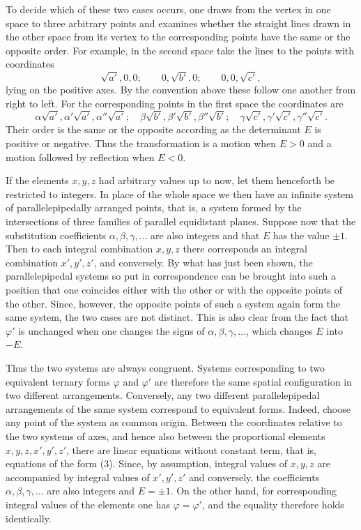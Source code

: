 \documentclass[11pt]{article}
\begin{document}
To decide which of these two cases occurs, one draws from the vertex in one space to three arbitrary points and examines whether the straight lines drawn in the other space from its vertex to the corresponding points have the same or the opposite order. For example, in the second space take the lines to the points with coordinates
\[
 \sqrt{a'},0,0;\qquad 0,\sqrt{b'},0;\qquad 0,0,\sqrt{c'},
\]
lying on the positive axes. By the convention above these follow one another from right to left. For the corresponding points in the first space the coordinates are
\[
 \alpha\sqrt{a'},\alpha'\sqrt{a'},\alpha''\sqrt{a'};\quad
 \beta\sqrt{b'},\beta'\sqrt{b'},\beta''\sqrt{b'};\quad
 \gamma\sqrt{c'},\gamma'\sqrt{c'},\gamma''\sqrt{c'}.
\]
Their order is the same or the opposite according as the determinant $E$ is positive or negative. Thus the transformation is a motion when $E>0$ and a motion followed by reflection when $E<0$.

If the elements $x,y,z$ had arbitrary values up to now, let them henceforth be restricted to integers. In place of the whole space we then have an infinite system of parallelepipedally arranged points, that is, a system formed by the intersections of three families of parallel equidistant planes. Suppose now that the substitution coefficients $\alpha,\beta,\gamma,\ldots$ are also integers and that $E$ has the value $\pm1$. Then to each integral combination $x,y,z$ there corresponds an integral combination $x',y',z'$, and conversely. By what has just been shown, the parallelepipedal systems so put in correspondence can be brought into such a position that one coincides either with the other or with the opposite points of the other. Since, however, the opposite points of such a system again form the same system, the two cases are not distinct. This is also clear from the fact that $\varphi'$ is unchanged when one changes the signs of $\alpha,\beta,\gamma,\ldots$, which changes $E$ into $-E$.

Thus the two systems are always congruent. Systems corresponding to two equivalent ternary forms $\varphi$ and $\varphi'$ are therefore the same spatial configuration in two different arrangements. Conversely, any two different parallelepipedal arrangements of the same system correspond to equivalent forms. Indeed, choose any point of the system as common origin. Between the coordinates relative to the two systems of axes, and hence also between the proportional elements $x,y,z,x',y',z'$, there are linear equations without constant term, that is, equations of the form (3). Since, by assumption, integral values of $x,y,z$ are accompanied by integral values of $x',y',z'$ and conversely, the coefficients $\alpha,\beta,\gamma,\ldots$ are also integers and $E=\pm1$. On the other hand, for corresponding integral values of the elements one has $\varphi=\varphi'$, and the equality therefore holds identically.
\end{document}
